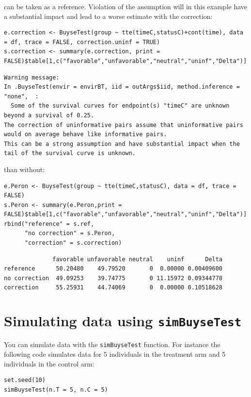 \documentclass[12pt]{article}
\begin{document}
can be taken as a reference. Violation of the assumption will in this
example have a substantial impact and lead to a worse estimate with
the correction:
\lstset{language=r,label= ,caption= ,captionpos=b,numbers=none}
\begin{lstlisting}
e.correction <- BuyseTest(group ~ tte(timeC,statusC)+cont(time), data = df, trace = FALSE, correction.uninf = TRUE)
s.correction <- summary(e.correction, print = FALSE)$table[1,c("favorable","unfavorable","neutral","uninf","Delta")]
\end{lstlisting}

\begin{verbatim}
Warning message:
In .BuyseTest(envir = envirBT, iid = outArgs$iid, method.inference = "none",  :
  Some of the survival curves for endpoint(s) "timeC" are unknown beyond a survival of 0.25.
The correction of uninformative pairs assume that uninformative pairs would on average behave like informative pairs. 
This can be a strong assumption and have substantial impact when the tail of the survival curve is unknown.
\end{verbatim}


than without:
\lstset{language=r,label= ,caption= ,captionpos=b,numbers=none}
\begin{lstlisting}
e.Peron <- BuyseTest(group ~ tte(timeC,statusC), data = df, trace = FALSE)
s.Peron <- summary(e.Peron,print = FALSE)$table[1,c("favorable","unfavorable","neutral","uninf","Delta")]
rbind("reference" = s.ref,
      "no correction" = s.Peron,
      "correction" = s.correction)
\end{lstlisting}
\begin{verbatim}
              favorable unfavorable neutral    uninf      Delta
reference      50.20480    49.79520       0  0.00000 0.00409600
no correction  49.09253    39.74775       0 11.15972 0.09344778
correction     55.25931    44.74069       0  0.00000 0.10518628
\end{verbatim}


\clearpage

\section{Simulating data using \texttt{simBuyseTest}}
\label{sec:org4e9acc4}
You can simulate data with the \texttt{simBuyseTest} function. For instance
the following code simulates data for 5 individuals in the treatment
arm and 5 individuals in the control arm:
\lstset{language=r,label= ,caption= ,captionpos=b,numbers=none}
\begin{lstlisting}
set.seed(10)
simBuyseTest(n.T = 5, n.C = 5)
\end{lstlisting}
\end{document}

